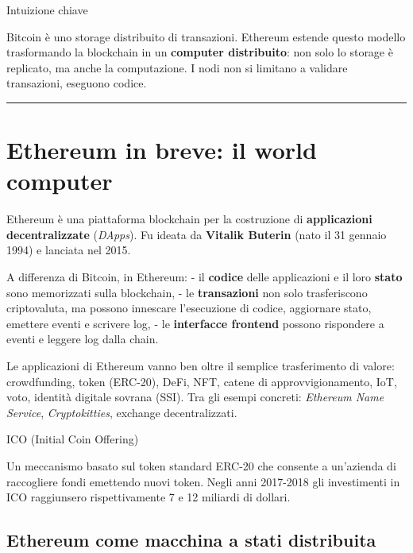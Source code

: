 \documentclass[
  italian,
  openany]{book}
\begin{document}
\begin{callouttip}{Intuizione chiave}

Bitcoin è uno storage distribuito di transazioni. Ethereum estende
questo modello trasformando la blockchain in un \textbf{computer
distribuito}: non solo lo storage è replicato, ma anche la computazione.
I nodi non si limitano a validare transazioni, eseguono codice.

\end{callouttip}

\begin{center}\rule{0.5\linewidth}{0.5pt}\end{center}

\section{Ethereum in breve: il world
computer}\label{ethereum-in-breve-il-world-computer}

Ethereum è una piattaforma blockchain per la costruzione di
\textbf{applicazioni decentralizzate} (\emph{DApps}). Fu ideata da
\textbf{Vitalik Buterin} (nato il 31 gennaio 1994) e lanciata nel 2015.

A differenza di Bitcoin, in Ethereum: - il \textbf{codice} delle
applicazioni e il loro \textbf{stato} sono memorizzati sulla blockchain,
- le \textbf{transazioni} non solo trasferiscono criptovaluta, ma
possono innescare l'esecuzione di codice, aggiornare stato, emettere
eventi e scrivere log, - le \textbf{interfacce frontend} possono
rispondere a eventi e leggere log dalla chain.

Le applicazioni di Ethereum vanno ben oltre il semplice trasferimento di
valore: crowdfunding, token (ERC-20), DeFi, NFT, catene di
approvvigionamento, IoT, voto, identità digitale sovrana (SSI). Tra gli
esempi concreti: \emph{Ethereum Name Service}, \emph{Cryptokitties},
exchange decentralizzati.

\begin{calloutnote}{ICO (Initial Coin Offering)}

Un meccanismo basato sul token standard ERC-20 che consente a un'azienda
di raccogliere fondi emettendo nuovi token. Negli anni 2017-2018 gli
investimenti in ICO raggiunsero rispettivamente 7 e 12 miliardi di
dollari.

\end{calloutnote}

\subsection{Ethereum come macchina a stati
distribuita}\label{ethereum-come-macchina-a-stati-distribuita}
\end{document}
